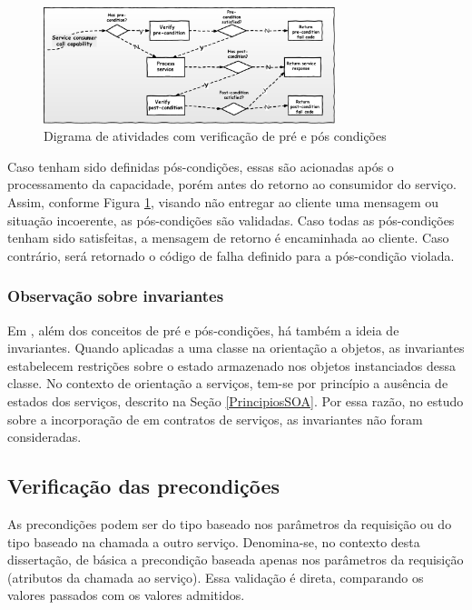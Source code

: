 \begin{figure}[!htb]
\centering
\includegraphics[width=85mm,trim = 0mm 0mm 0mm
0mm,clip]{img/FluxoDbcCondicoes.pdf} 
\caption{Digrama de atividades com verificação de pré e pós condições}
\label{FigServiceDbC}
\end{figure}

Caso tenham sido definidas pós-condições, essas são acionadas após o
processamento da capacidade, porém antes do retorno ao consumidor do serviço.
Assim, conforme Figura \ref{FigServiceDbC}, visando não entregar ao cliente uma
mensagem ou situação incoerente, as pós-condições são validadas. Caso todas as
pós-condições tenham sido satisfeitas, a mensagem de retorno é encaminhada ao
cliente. Caso contrário, será retornado o código de falha definido para a
pós-condição violada.

\subsubsection{Observação sobre invariantes}


Em \designbycontract{}, além dos conceitos de pré e pós-condições,
há também a ideia de invariantes\cite{meyer1997object}. Quando aplicadas a uma classe na
orientação a objetos, as invariantes estabelecem restrições sobre o estado
armazenado nos objetos instanciados dessa classe. No contexto de orientação a
serviços, tem-se por princípio a ausência de estados dos serviços, descrito na
Seção \ref{PrincipiosSOA}. Por essa razão, no estudo sobre a incorporação de
\designbycontract{} em contratos de serviços, as invariantes não foram
consideradas.


\subsection{Verificação das precondições}


As precondições podem ser do tipo baseado nos parâmetros da requisição ou do
tipo baseado na chamada a outro serviço. Denomina-se, no contexto desta
dissertação, de básica a precondição baseada apenas nos parâmetros da
requisição (atributos da chamada ao serviço). Essa validação é direta,
comparando os valores passados com os valores admitidos. 

